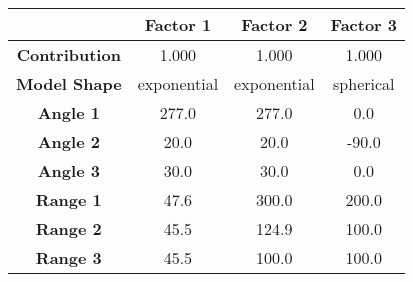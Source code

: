 \begin{tabular}{cccc}
\toprule
{} &     Factor 1 &     Factor 2 &   Factor 3 \\
\midrule
\textbf{Contribution} &        1.000 &        1.000 &      1.000 \\
\textbf{Model Shape } &  exponential &  exponential &  spherical \\
\textbf{Angle 1     } &        277.0 &        277.0 &        0.0 \\
\textbf{Angle 2     } &         20.0 &         20.0 &      -90.0 \\
\textbf{Angle 3     } &         30.0 &         30.0 &        0.0 \\
\textbf{Range 1     } &         47.6 &        300.0 &      200.0 \\
\textbf{Range 2     } &         45.5 &        124.9 &      100.0 \\
\textbf{Range 3     } &         45.5 &        100.0 &      100.0 \\
\bottomrule
\end{tabular}
